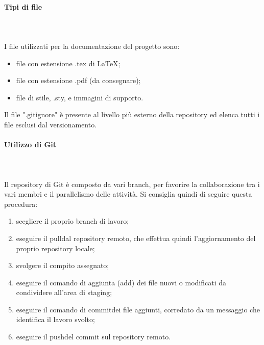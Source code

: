 \paragraph{Tipi di file} \mbox{} \\ \mbox{} \\
I file utilizzati per la documentazione del progetto sono: \begin{itemize}
\item file con estensione .tex di \LaTeX{};
\item file con estensione .pdf (da consegnare);
\item file di stile, .sty,  e immagini di supporto.
\end{itemize}
Il file ".gitignore" è presente al livello più esterno della repository ed elenca tutti i file esclusi dal versionamento.

\paragraph{Utilizzo di Git} \mbox{} \\ \mbox{} \\
Il repository di Git è composto da vari branch\glo, per favorire la collaborazione tra i vari membri e il parallelismo delle attività. Si consiglia quindi di seguire questa procedura:
\begin{enumerate}
\item scegliere il proprio branch di lavoro;
\item eseguire il pull\glo dal repository remoto, che effettua quindi l'aggiornamento del proprio repository locale;
\item svolgere il compito assegnato;
\item eseguire il comando di aggiunta (add) dei file nuovi o modificati da condividere all'area di staging\glo;
\item eseguire il comando di commit\glo dei file aggiunti, corredato da un messaggio che identifica il lavoro svolto;
\item eseguire il push\glo del commit sul repository remoto.
\end{enumerate}
\pagebreak
